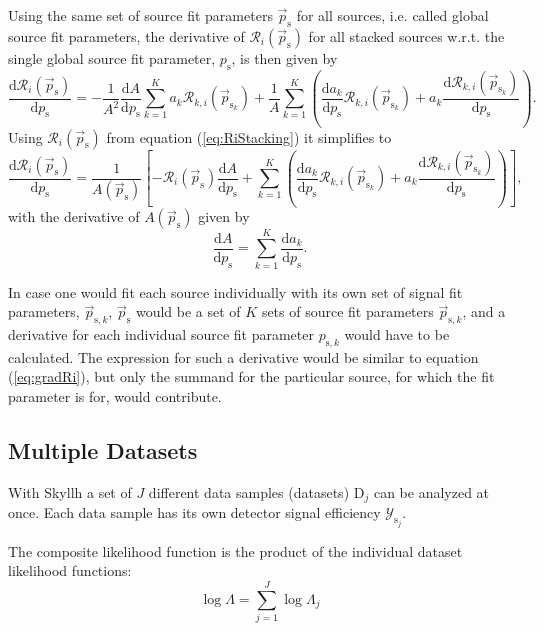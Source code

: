 \documentclass{article}
\newcommand{\ps}{\vec{p}_{\mathrm{s}}}
\newcommand{\psk}{\vec{p}_{\mathrm{s}_k}}
\begin{document}
Using the same set of source fit parameters $\ps$ for all sources, i.e. called
global source fit parameters, the derivative of $\mathcal{R}_i(\ps)$ for
all stacked sources w.r.t. the single global source fit parameter,
$p_{\mathrm{s}}$, is then given by
\begin{equation}
 \frac{\mathrm{d} \mathcal{R}_{i}(\ps)}{\mathrm{d} p_{\mathrm{s}}} = - \frac{1}{A^2} \frac{\mathrm{d} A}{\mathrm{d} p_{\mathrm{s}}} \sum_{k=1}^{K} a_{k} \mathcal{R}_{k,i}(\psk) + \frac{1}{A}\sum_{k=1}^{K} \left( \frac{\mathrm{d} a_{k}}{\mathrm{d} p_{\mathrm{s}}}\mathcal{R}_{k,i}(\psk) + a_{k}\frac{\mathrm{d} \mathcal{R}_{k,i}(\psk)}{\mathrm{d} p_{\mathrm{s}}} \right).
\end{equation}
Using $\mathcal{R}_i(\ps)$ from equation (\ref{eq:RiStacking}) it simplifies to
\begin{equation}
 \frac{\mathrm{d} \mathcal{R}_{i}(\ps)}{\mathrm{d} p_{\mathrm{s}}} = \frac{1}{A(\ps)}\left[ -\mathcal{R}_i(\ps)\frac{\mathrm{d} A}{\mathrm{d} p_{\mathrm{s}}} + \sum_{k=1}^{K} \left( \frac{\mathrm{d} a_{k}}{\mathrm{d} p_{\mathrm{s}}}\mathcal{R}_{k,i}(\psk) + a_{k}\frac{\mathrm{d} \mathcal{R}_{k,i}(\psk)}{\mathrm{d} p_{\mathrm{s}}} \right) \right],
 \label{eq:gradRi}
\end{equation}
with the derivative of $A(\ps)$ given by
\begin{equation}
 \frac{\mathrm{d} A}{\mathrm{d} p_{\mathrm{s}}} = \sum_{k=1}^{K} \frac{\mathrm{d} a_k}{\mathrm{d} p_{\mathrm{s}}}.
\end{equation}

In case one would fit each source individually with its own set of signal fit
parameters, $\vec{p}_{\mathrm{s},k}$, $\ps$ would be a set of $K$ sets
of source fit parameters $\vec{p}_{\mathrm{s},k}$, and a derivative for each
individual source fit parameter $p_{\mathrm{s},k}$ would have to be calculated.
The expression for such a derivative would be similar to equation (\ref{eq:gradRi}),
but only the summand for the particular source, for which the fit parameter is for, would
contribute.


\subsection{Multiple Datasets}

With Skyllh a set of $J$ different data samples (datasets) $\mathrm{D}_j$ can be
analyzed at once. Each data sample has its own detector signal efficiency
$\mathcal{Y}_{\mathrm{s}_j}$.

The composite likelihood function is the product of the individual dataset
likelihood functions:
\begin{equation}
 \log \Lambda = \sum_{j=1}^{J} \log \Lambda_j
 \label{eq:logLambdaComposite}
\end{equation}
\end{document}
